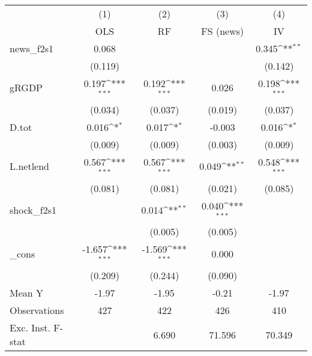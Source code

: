 {
\def\sym#1{\ifmmode^{#1}\else\(^{#1}\)\fi}
\begin{tabular}{l*{4}{c}}
\toprule
            &\multicolumn{1}{c}{(1)}&\multicolumn{1}{c}{(2)}&\multicolumn{1}{c}{(3)}&\multicolumn{1}{c}{(4)}\\
            &\multicolumn{1}{c}{OLS}&\multicolumn{1}{c}{RF}&\multicolumn{1}{c}{FS (news)}&\multicolumn{1}{c}{IV}\\
\midrule
news\_f2s1   &       0.068         &                     &                     &       0.345\sym{**} \\
            &     (0.119)         &                     &                     &     (0.142)         \\
\addlinespace
gRGDP       &       0.197\sym{***}&       0.192\sym{***}&       0.026         &       0.198\sym{***}\\
            &     (0.034)         &     (0.037)         &     (0.019)         &     (0.037)         \\
\addlinespace
D.tot       &       0.016\sym{*}  &       0.017\sym{*}  &      -0.003         &       0.016\sym{*}  \\
            &     (0.009)         &     (0.009)         &     (0.003)         &     (0.009)         \\
\addlinespace
L.netlend   &       0.567\sym{***}&       0.567\sym{***}&       0.049\sym{**} &       0.548\sym{***}\\
            &     (0.081)         &     (0.081)         &     (0.021)         &     (0.085)         \\
\addlinespace
shock\_f2s1  &                     &       0.014\sym{**} &       0.040\sym{***}&                     \\
            &                     &     (0.005)         &     (0.005)         &                     \\
\addlinespace
\_cons      &      -1.657\sym{***}&      -1.569\sym{***}&       0.000         &                     \\
            &     (0.209)         &     (0.244)         &     (0.090)         &                     \\
\midrule
Mean Y      &       -1.97         &       -1.95         &       -0.21         &       -1.97         \\
Observations&         427         &         422         &         426         &         410         \\
Exc. Inst. F-stat&                     &       6.690         &      71.596         &      70.349         \\
\bottomrule
\end{tabular}
}
